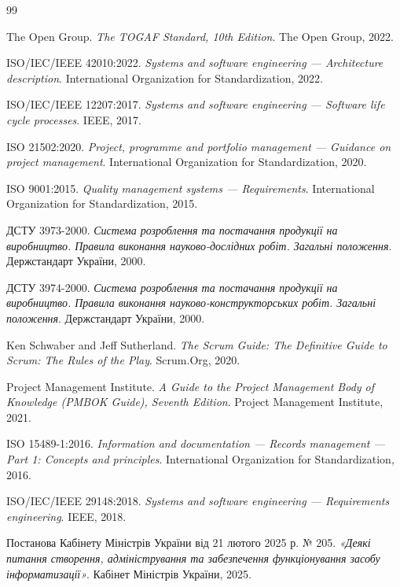 \documentclass{article}
\begin{document}
\begin{thebibliography}{99}

 The Open Group.
\newblock \emph{The TOGAF Standard, 10th Edition}.
\newblock The Open Group, 2022.

 ISO/IEC/IEEE 42010:2022.
\newblock \emph{Systems and software engineering --- Architecture description}.
\newblock International Organization for Standardization, 2022.

 ISO/IEC/IEEE 12207:2017.
\newblock \emph{Systems and software engineering --- Software life cycle processes}.
\newblock IEEE, 2017.

 ISO 21502:2020.
\newblock \emph{Project, programme and portfolio management --- Guidance on project management}.
\newblock International Organization for Standardization, 2020.

 ISO 9001:2015.
\newblock \emph{Quality management systems --- Requirements}.
\newblock International Organization for Standardization, 2015.

 ДСТУ 3973-2000.
\newblock \emph{Система розроблення та постачання продукції на виробництво. Правила виконання науково-дослідних робіт. Загальні положення}.
\newblock Держстандарт України, 2000.

 ДСТУ 3974-2000.
\newblock \emph{Система розроблення та постачання продукції на виробництво. Правила виконання науково-конструкторських робіт. Загальні положення}.
\newblock Держстандарт України, 2000.

 Ken Schwaber and Jeff Sutherland.
\newblock \emph{The Scrum Guide: The Definitive Guide to Scrum: The Rules of the Play}.
\newblock Scrum.Org, 2020.

 Project Management Institute.
\newblock \emph{A Guide to the Project Management Body of Knowledge (PMBOK Guide), Seventh Edition}.
\newblock Project Management Institute, 2021.

 ISO 15489-1:2016.
\newblock \emph{Information and documentation --- Records management --- Part 1: Concepts and principles}.
\newblock International Organization for Standardization, 2016.

 ISO/IEC/IEEE 29148:2018.
\newblock \emph{Systems and software engineering --- Requirements engineering}.
\newblock IEEE, 2018.

 Постанова Кабінету Міністрів України від 21 лютого 2025 р. № 205.
\newblock \emph{«Деякі питання створення, адміністрування та забезпечення функціонування засобу інформатизації»}.
\newblock Кабінет Міністрів України, 2025.

\end{thebibliography}
\end{document}
